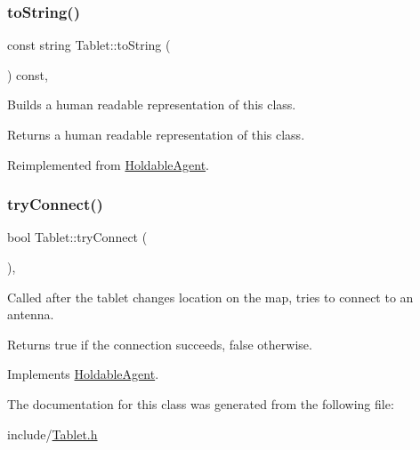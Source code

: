 \subsubsection{\texorpdfstring{toString()}{toString()}}
{\footnotesize\ttfamily const string Tablet\+::to\+String (\begin{DoxyParamCaption}{ }\end{DoxyParamCaption}) const\hspace{0.3cm}{\ttfamily [override]}, {\ttfamily [virtual]}}

Builds a human readable representation of this class. \begin{DoxyReturn}{Returns}
a human readable representation of this class. 
\end{DoxyReturn}


Reimplemented from \mbox{\hyperlink{class_holdable_agent_a2c581226b8994f24b6b2306ae17dbb52}{Holdable\+Agent}}.

\mbox{\label{class_tablet_a2328422e1706dfeb2b51a6960e6879f0}} 
\subsubsection{\texorpdfstring{tryConnect()}{tryConnect()}}
{\footnotesize\ttfamily bool Tablet\+::try\+Connect (\begin{DoxyParamCaption}{ }\end{DoxyParamCaption})\hspace{0.3cm}{\ttfamily [override]}, {\ttfamily [virtual]}}

Called after the tablet changes location on the map, tries to connect to an antenna. \begin{DoxyReturn}{Returns}
true if the connection succeeds, false otherwise. 
\end{DoxyReturn}


Implements \mbox{\hyperlink{class_holdable_agent_a0789d757d81b43ee016e9362046f6dea}{Holdable\+Agent}}.



The documentation for this class was generated from the following file\+:\begin{DoxyCompactItemize}
\item 
include/\mbox{\hyperlink{_tablet_8h}{Tablet.\+h}}\end{DoxyCompactItemize}
